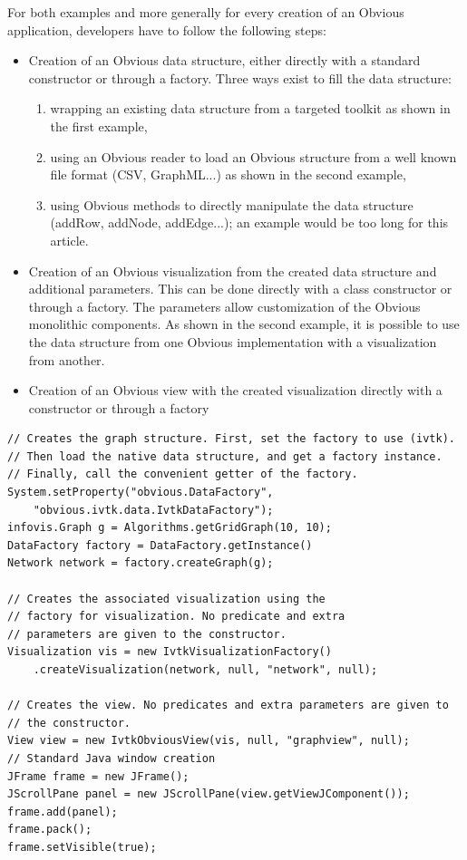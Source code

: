For both examples and more generally for every creation of an Obvious
application, developers have to follow the following steps:
\begin{itemize}[noitemsep]
\item Creation of an Obvious data structure, either directly with a
  standard constructor or through a factory.  Three ways exist to fill
  the data structure:
  \begin{enumerate}[noitemsep]
  \item wrapping an existing data structure from a targeted toolkit as
    shown in the first example,
  \item using an Obvious reader to load an Obvious structure from a
    well known file format (CSV, GraphML...) as shown in the second
    example,
  \item using Obvious methods to directly manipulate the data
    structure (addRow, addNode, addEdge...); an example would be too
    long for this article.
 \end{enumerate}

\item Creation of an Obvious visualization from the created data
  structure and additional parameters.  This can be done directly with
  a class constructor or through a factory.  The parameters allow
  customization of the Obvious monolithic components.  As shown in the
  second example, it is possible to use the data structure from
  one Obvious implementation with a visualization from another.

 \item Creation of an Obvious view with the created visualization
   directly with a constructor or through a factory
\end{itemize} 

\begin{lstlisting}[caption={Visualizing a graph with Obvious},label=codeSample1]
// Creates the graph structure. First, set the factory to use (ivtk).
// Then load the native data structure, and get a factory instance.
// Finally, call the convenient getter of the factory.
System.setProperty("obvious.DataFactory",
    "obvious.ivtk.data.IvtkDataFactory");
infovis.Graph g = Algorithms.getGridGraph(10, 10);
DataFactory factory = DataFactory.getInstance()
Network network = factory.createGraph(g);

// Creates the associated visualization using the
// factory for visualization. No predicate and extra
// parameters are given to the constructor.
Visualization vis = new IvtkVisualizationFactory()
    .createVisualization(network, null, "network", null);

// Creates the view. No predicates and extra parameters are given to
// the constructor.
View view = new IvtkObviousView(vis, null, "graphview", null);
// Standard Java window creation
JFrame frame = new JFrame();
JScrollPane panel = new JScrollPane(view.getViewJComponent());
frame.add(panel);
frame.pack();
frame.setVisible(true);
\end{lstlisting}


